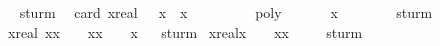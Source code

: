 \begin{isabellebody}
\isadelimproof
\ %
\endisadelimproof
%
\isatagproof
{}\isamarkupfalse%
\ sturm%
\endisatagproof
{\isafoldproof}%
%
\isadelimproof
%
\endisadelimproof
\isanewline
\isanewline
\isanewline
{}\isamarkupfalse%
\isanewline
\ \ {\isachardoublequoteopen}card\ {\isacharbraceleft}x{\isacharcolon}{\isacharcolon}real{\isachardot}\ {\isacharminus}{}{\isachardot}{}{}{}{}{}{}\ {\isacharless}\ x\ {\isasymand}\ x\ {\isacharless}\ {}{\isachardot}{}{}{}{}{}{}\ {\isasymand}\ \isanewline
\ \ \ \ \ poly\ {\isacharbrackleft}{\isacharcolon}{}{\isacharcomma}\ {\isacharminus}{}{}{\isacharslash}{}{}{}{}{}{}{}{\isacharcomma}\ {\isacharminus}{}{}{\isacharslash}{}{}{}{}{}{}{}{}{\isacharcomma}\ {}{\isacharslash}{}{\isacharcomma}\ {}{\isacharslash}{}{}{\isacharcomma}\ {}{\isacharslash}{}{}{}{\isacharcolon}{\isacharbrackright}\ x\ {\isacharequal}\ {}{\isacharbraceright}\ {\isacharequal}\ {}{\isachardoublequoteclose}\isanewline
%
\isadelimproof
\ \ %
\endisadelimproof
%
\isatagproof
{}\isamarkupfalse%
\ sturm%
\endisatagproof
{\isafoldproof}%
%
\isadelimproof
\isanewline
%
\endisadelimproof
\isanewline
{}\isamarkupfalse%
\ {\isachardoublequoteopen}{\isasymforall}x{\isacharcolon}{\isacharcolon}real{\isachardot}\ x{\isacharasterisk}x\ {\isasymnoteq}\ {}\ {\isasymor}\ x{\isacharasterisk}x\ {\isacharminus}\ {}\ {\isasymnoteq}\ {}{\isacharasterisk}x{\isachardoublequoteclose}%
\isadelimproof
\ %
\endisadelimproof
%
\isatagproof
{}\isamarkupfalse%
\ sturm%
\endisatagproof
{\isafoldproof}%
%
\isadelimproof
%
\endisadelimproof
\isanewline
\isanewline
{}\isamarkupfalse%
\ {\isachardoublequoteopen}{\isacharparenleft}x{\isacharcolon}{\isacharcolon}real{\isacharparenright}{\isacharasterisk}x{\isacharplus}{}\ {\isasymnoteq}\ {}\ {\isasymand}\ {\isacharparenleft}x{\isacharcircum}{}{\isacharplus}{}{\isacharparenright}{\isacharasterisk}{\isacharparenleft}x{\isacharcircum}{}{\isacharplus}{}{\isacharparenright}\ {\isasymnoteq}\ {}{\isachardoublequoteclose}%
\isadelimproof
\ %
\endisadelimproof
%
\isatagproof
{}\isamarkupfalse%
\ sturm%
\endisatagproof
{\isafoldproof}%
%
\isadelimproof
%
\endisadelimproof
\isanewline
\isanewline
%
\isadelimtheory
\isanewline
%
\endisadelimtheory
%
\isatagtheory
{}\isamarkupfalse%
%
\endisatagtheory
{\isafoldtheory}%
%
\isadelimtheory
%
\endisadelimtheory
\end{isabellebody}%
